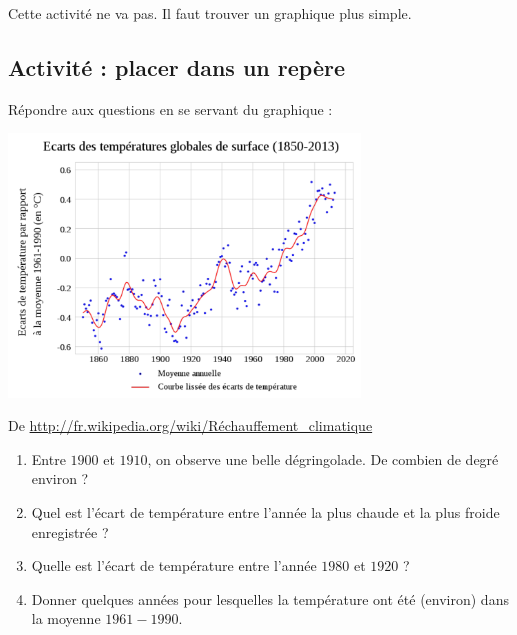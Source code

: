 
{\Large Cette activité ne va pas. Il faut trouver un graphique plus simple.}

\subsection*{Activité : placer dans un repère}

Répondre aux questions en se servant du graphique :

\includegraphics[width=0.7\textwidth]{EcartsTempSurface2013.pdf}

De \url{http://fr.wikipedia.org/wiki/Réchauffement_climatique}


\begin{enumerate}
    \item
        Entre \( 1900\) et \( 1910\), on observe une belle dégringolade. De combien de degré environ ?
    \item
        Quel est l'écart de température entre l'année la plus chaude et la plus froide enregistrée ?
    \item
        Quelle est l'écart de température entre l'année \( 1980\) et \( 1920\) ?
    \item
        Donner quelques années pour lesquelles la température ont été (environ) dans la moyenne \( 1961-1990\).
\end{enumerate}
